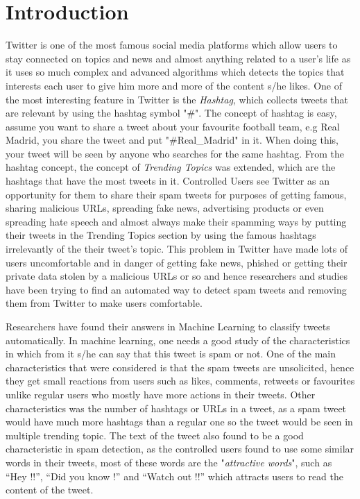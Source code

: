 \documentclass[conference]{IEEEtran}
\begin{document}
\section{Introduction}
Twitter is one of the most famous social media platforms which allow users to stay connected on topics and news and almost anything related to a user's life as it uses so much complex and advanced algorithms which detects the topics that interests each user to give him more and more of the content s/he likes. One of the most interesting feature in Twitter is the \textit{Hashtag}, which collects tweets that are relevant by using the hashtag symbol "\#". The concept of hashtag is easy, assume you want to share a tweet about your favourite football team, e.g Real Madrid, you share the tweet and put "\#Real\_Madrid" in it. When doing this, your tweet will be seen by anyone who searches for the same hashtag. From the hashtag concept, the concept of \textit{Trending Topics} was extended, which are the hashtags that have the most tweets in it. Controlled Users see Twitter as an opportunity for them to share their spam tweets for purposes of getting famous, sharing malicious URLs, spreading fake news, advertising products or even spreading hate speech and almost always make their spamming ways by putting their tweets in the Trending Topics section by using the famous hashtags irrelevantly of the their tweet's topic. This problem in Twitter have made lots of users uncomfortable and in danger of getting fake news, phished or getting their private data stolen by a malicious URLs or so and hence researchers and studies have been trying to find an automated way to detect spam tweets and removing them from Twitter to make users comfortable.

Researchers have found their answers in Machine Learning to classify tweets automatically. In machine learning, one needs a good study of the characteristics in which from it s/he can say that this tweet is spam or not. One of the main characteristics that were considered is that the spam tweets are unsolicited, hence they get small reactions from users such as likes, comments, retweets or favourites unlike regular users who mostly have more actions in their tweets. Other characteristics was the number of hashtags or URLs in a tweet, as a spam tweet would have much more hashtags than a regular one so the tweet would be seen in multiple trending topic. The text of the tweet also found to be a good characteristic in spam detection, as the controlled users found to use some similar words in their tweets, most of these words are the "\textit{attractive words}", such as ``Hey !!'', ``Did you know !'' and ``Watch out !!'' which attracts users to read the content of the tweet.
\end{document}
